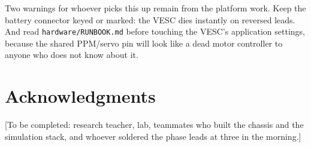\documentclass[12pt]{article}
\newcommand{\printrefs}{\printbibliography[title={References}]}
\newcommand{\printrefs}{\renewcommand{\refname}{References}}
\begin{document}
Two warnings for whoever picks this up remain from the platform work. Keep the battery connector
keyed or marked: the VESC dies instantly on reversed leads. And read
\texttt{hardware/RUNBOOK.md} before touching the VESC's application settings, because the shared
PPM/servo pin will look like a dead motor controller to anyone who does not know about it.

\section*{Acknowledgments}

[To be completed: research teacher, lab, teammates who built the chassis and the
simulation stack, and whoever soldered the phase leads at three in the morning.]

\printrefs
\end{document}
